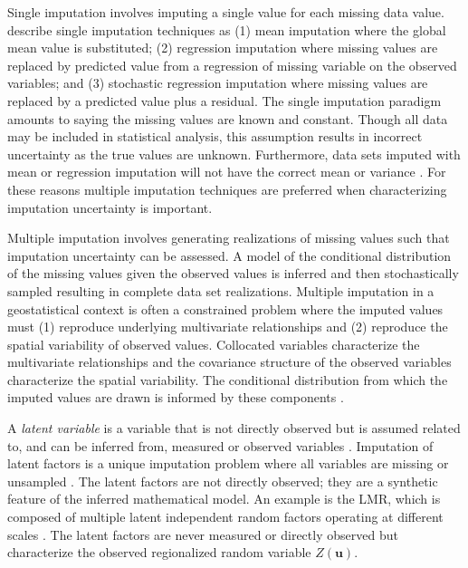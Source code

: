 Single imputation involves imputing a single value for each missing data value. \cite{little2019statistical} describe single imputation techniques as (1) mean imputation where the global mean value is substituted; (2) regression imputation where missing values are replaced by predicted value from a regression of missing variable on the observed variables; and (3) stochastic regression imputation where missing values are replaced by a predicted value plus a residual. The single imputation paradigm amounts to saying the missing values are known and constant. Though all data may be included in statistical analysis, this assumption results in incorrect uncertainty as the true values are unknown. Furthermore, data sets imputed with mean or regression imputation will not have the correct mean or variance \cite{barnett2015multivariate}. For these reasons multiple imputation techniques are preferred when characterizing imputation uncertainty is important.

Multiple imputation involves generating realizations of missing values such that imputation uncertainty can be assessed. A model of the conditional distribution of the missing values given the observed values is inferred and then stochastically sampled resulting in complete data set realizations. Multiple imputation in a geostatistical context is often a constrained problem where the imputed values must (1) reproduce underlying multivariate relationships and (2) reproduce the spatial variability of observed values\citep{barnett2015multivariate}. Collocated variables characterize the multivariate relationships and the covariance structure of the observed variables characterize the spatial variability. The conditional distribution from which the imputed values are drawn is informed by these components \citep{hadavand2023spatial}.

A \textit{latent variable} is a variable that is not directly observed but is assumed related to, and can be inferred from, measured or observed variables \citep{everitt2010cambridge}. Imputation of latent factors is a unique imputation problem where all variables are missing or unsampled \citep{little2019statistical}. The latent factors are not directly observed; they are a synthetic feature of the inferred mathematical model. An example is the \gls{LMR}, which is composed of multiple latent independent random factors operating at different scales \citep{goovaerts1992factorial}. The latent factors are never measured or directly observed but characterize the observed regionalized random variable $Z(\mathbf{u})$.


